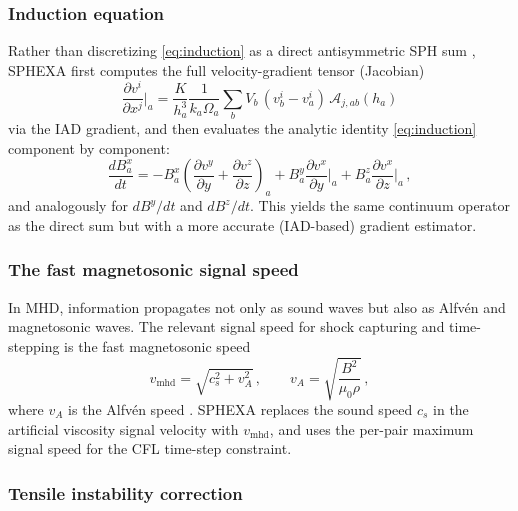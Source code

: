\subsubsection*{Induction equation}

Rather than discretizing \eqref{eq:induction} as a direct antisymmetric SPH sum \cite{Wissing2020}, SPHEXA first computes the full velocity-gradient tensor (Jacobian)
\begin{equation}
    \frac{\partial v^i}{\partial x^j}\bigg|_a = \frac{K}{h_a^3}\frac{1}{k_a \Omega_a} \sum_b V_b \,(v^i_b - v^i_a)\, \mathcal{A}_{j,ab}(h_a)
    \label{eq:vel_jacobian}
\end{equation}
via the IAD gradient, and then evaluates the analytic identity \eqref{eq:induction} component by component:
\begin{equation}
    \frac{dB^x_a}{dt} = -B^x_a \left(\frac{\partial v^y}{\partial y} + \frac{\partial v^z}{\partial z}\right)_{\!a} + B^y_a \frac{\partial v^x}{\partial y}\bigg|_a + B^z_a \frac{\partial v^x}{\partial z}\bigg|_a\,,
    \label{eq:induction_code}
\end{equation}
and analogously for $dB^y/dt$ and $dB^z/dt$. This yields the same continuum operator as the direct sum but with a more accurate (IAD-based) gradient estimator.


\subsubsection*{The fast magnetosonic signal speed}

In MHD, information propagates not only as sound waves but also as Alfv\'en and magnetosonic waves. The relevant signal speed for shock capturing and time-stepping is the fast magnetosonic speed
\begin{equation}
    v_\mathrm{mhd} = \sqrt{c_s^2 + v_A^2}\,, \qquad v_A = \sqrt{\frac{B^2}{\mu_0 \rho}}\,,
    \label{eq:vmhd}
\end{equation}
where $v_A$ is the Alfv\'en speed \cite{Wissing2020, Price2018}. SPHEXA replaces the sound speed $c_s$ in the artificial viscosity signal velocity with $v_\mathrm{mhd}$, and uses the per-pair maximum signal speed for the CFL time-step constraint.


\subsubsection*{Tensile instability correction}

